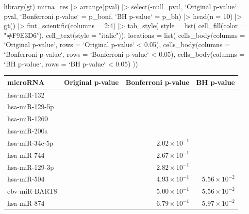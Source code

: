 \documentclass[a4paper]{article}
\begin{document}
\begin{Schunk}
\begin{Sinput}
library(gt)
mirna_res |> arrange(pval) |> 
  select(-null_pval, `Original p-value` = pval, 
         `Bonferroni p-value` = p_bonf,  `BH p-value` = p_bh) |> 
  head(n = 10) |> 
  gt() |> fmt_scientific(columns = 2:4) |> 
  tab_style(
    style = list(
      cell_fill(color = "#F9E3D6"),
      cell_text(style = "italic")),
    locations = list(
      cells_body(columns = `Original p-value`, 
                 rows = `Original p-value` < 0.05),
      cells_body(columns = `Bonferroni p-value`, 
                 rows = `Bonferroni p-value` < 0.05),
      cells_body(columns = `BH p-value`, rows = `BH p-value` < 0.05)
    ))
\end{Sinput}
\begin{longtable}{lrrr}
\toprule
microRNA & Original p-value & Bonferroni p-value & BH p-value \\ 
\midrule\addlinespace[2.5pt]
hsa-miR-132 & \cellcolor[HTML]{F9E3D6}{$1.28 \times 10^{-12}$} & \cellcolor[HTML]{F9E3D6}{$3.95 \times 10^{-10}$} & \cellcolor[HTML]{F9E3D6}{$3.95 \times 10^{-10}$} \\ 
hsa-miR-129-5p & \cellcolor[HTML]{F9E3D6}{$3.31 \times 10^{-7}$} & \cellcolor[HTML]{F9E3D6}{$1.02 \times 10^{-4}$} & \cellcolor[HTML]{F9E3D6}{$5.12 \times 10^{-5}$} \\ 
hsa-miR-1260 & \cellcolor[HTML]{F9E3D6}{$6.33 \times 10^{-5}$} & \cellcolor[HTML]{F9E3D6}{$1.96 \times 10^{-2}$} & \cellcolor[HTML]{F9E3D6}{$6.52 \times 10^{-3}$} \\ 
hsa-miR-200a & \cellcolor[HTML]{F9E3D6}{$1.31 \times 10^{-4}$} & \cellcolor[HTML]{F9E3D6}{$4.05 \times 10^{-2}$} & \cellcolor[HTML]{F9E3D6}{$1.01 \times 10^{-2}$} \\ 
hsa-miR-34c-5p & \cellcolor[HTML]{F9E3D6}{$6.54 \times 10^{-4}$} & $2.02 \times 10^{-1}$ & \cellcolor[HTML]{F9E3D6}{$4.03 \times 10^{-2}$} \\ 
hsa-miR-744 & \cellcolor[HTML]{F9E3D6}{$8.65 \times 10^{-4}$} & $2.67 \times 10^{-1}$ & \cellcolor[HTML]{F9E3D6}{$4.03 \times 10^{-2}$} \\ 
hsa-miR-129-3p & \cellcolor[HTML]{F9E3D6}{$9.13 \times 10^{-4}$} & $2.82 \times 10^{-1}$ & \cellcolor[HTML]{F9E3D6}{$4.03 \times 10^{-2}$} \\ 
hsa-miR-504 & \cellcolor[HTML]{F9E3D6}{$1.60 \times 10^{-3}$} & $4.93 \times 10^{-1}$ & $5.56 \times 10^{-2}$ \\ 
ebv-miR-BART8 & \cellcolor[HTML]{F9E3D6}{$1.62 \times 10^{-3}$} & $5.00 \times 10^{-1}$ & $5.56 \times 10^{-2}$ \\ 
hsa-miR-874 & \cellcolor[HTML]{F9E3D6}{$2.20 \times 10^{-3}$} & $6.79 \times 10^{-1}$ & $5.97 \times 10^{-2}$ \\ 
\bottomrule
\end{longtable}
\end{Schunk}
\newpage
\end{document}
